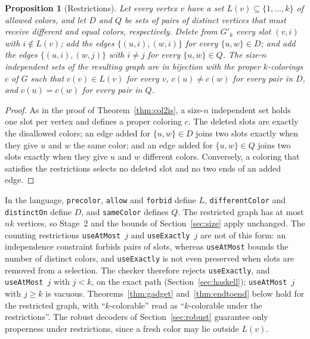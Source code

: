 \documentclass[a4paper,fleqn]{cas-sc}
\newtheorem{proposition}[theorem]{Proposition}
\begin{document}
\begin{proposition}[Restrictions]
\label{prop:restrictions}
Let every vertex $v$ have a set $L(v)\subseteq\{1,\dots,k\}$ of allowed colors, and
let $D$ and $Q$ be sets of pairs of distinct vertices that must receive different and
equal colors, respectively. Delete from $G'_k$ every slot $(v,i)$ with $i\notin L(v)$;
add the edges $\{(u,i),(w,i)\}$ for every $\{u,w\}\in D$; and add the edges
$\{(u,i),(w,j)\}$ with $i\ne j$ for every $\{u,w\}\in Q$. The size-$n$ independent
sets of the resulting graph are in bijection with the proper $k$-colorings $c$ of $G$
such that $c(v)\in L(v)$ for every $v$, $c(u)\ne c(w)$ for every pair in $D$, and
$c(u)=c(w)$ for every pair in $Q$.
\end{proposition}

\begin{proof}
As in the proof of Theorem~\ref{thm:col2is}, a size-$n$ independent set holds one slot
per vertex and defines a proper coloring $c$. The deleted slots are exactly the
disallowed colors; an edge added for $\{u,w\}\in D$ joins two slots exactly when they
give $u$ and $w$ the same color; and an edge added for $\{u,w\}\in Q$ joins two slots
exactly when they give $u$ and $w$ different colors. Conversely, a coloring that
satisfies the restrictions selects no deleted slot and no two ends of an added edge.
\end{proof}

\noindent In the language, \texttt{precolor}, \texttt{allow} and \texttt{forbid}
define $L$, \texttt{differentColor} and \texttt{distinctOn} define $D$, and
\texttt{sameColor} defines $Q$. The restricted graph has at most $nk$ vertices, so
Stage~2 and the bounds of Section~\ref{sec:size} apply unchanged. The counting
restrictions \texttt{useAtMost}~$j$ and \texttt{useExactly}~$j$ are not of this form:
an independence constraint forbids pairs of slots, whereas \texttt{useAtMost} bounds
the number of distinct colors, and \texttt{useExactly} is not even preserved when
slots are removed from a selection. The checker therefore rejects
\texttt{useExactly}, and \texttt{useAtMost}~$j$ with $j<k$, on the exact path
(Section~\ref{sec:haskell}); \texttt{useAtMost}~$j$ with $j\ge k$ is vacuous.
Theorems~\ref{thm:gadget} and~\ref{thm:endtoend} below hold for the restricted graph,
with ``$k$-colorable'' read as ``$k$-colorable under the restrictions''. The robust
decoders of Section~\ref{sec:robust} guarantee only properness under restrictions,
since a fresh color may lie outside $L(v)$.
\end{document}
